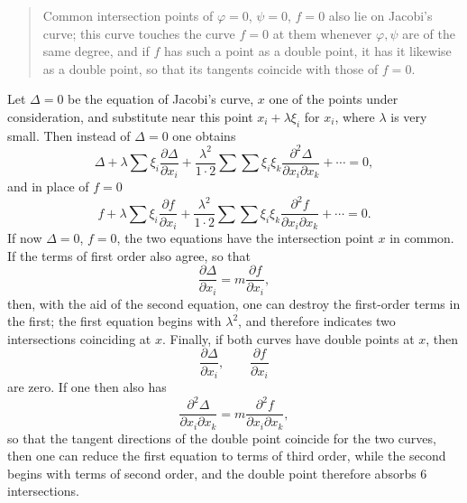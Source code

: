 \documentclass[10pt]{article}
\begin{document}
\begin{quote}
Common intersection points of \(\varphi=0\), \(\psi=0\), \(f=0\) also lie on Jacobi's curve; this curve touches the curve \(f=0\) at them whenever \(\varphi,\psi\) are of the same degree, and if \(f\) has such a point as a double point, it has it likewise as a double point, so that its tangents coincide with those of \(f=0\).
\end{quote}

Let \(\Delta=0\) be the equation of Jacobi's curve, \(x\) one of the points under consideration, and substitute near this point \(x_i+\lambda\xi_i\) for \(x_i\), where \(\lambda\) is very small. Then instead of \(\Delta=0\) one obtains
\[
\Delta+\lambda\sum \xi_i\frac{\partial\Delta}{\partial x_i}
+\frac{\lambda^2}{1\cdot2}\sum\sum \xi_i\xi_k
\frac{\partial^2\Delta}{\partial x_i\partial x_k}
+\cdots=0,
\]
and in place of \(f=0\)
\[
f+\lambda\sum \xi_i\frac{\partial f}{\partial x_i}
+\frac{\lambda^2}{1\cdot2}\sum\sum \xi_i\xi_k
\frac{\partial^2f}{\partial x_i\partial x_k}
+\cdots=0.
\]
If now \(\Delta=0\), \(f=0\), the two equations have the intersection point \(x\) in common. If the terms of first order also agree, so that
\[
\frac{\partial\Delta}{\partial x_i}
=m\frac{\partial f}{\partial x_i},
\]
then, with the aid of the second equation, one can destroy the first-order terms in the first; the first equation begins with \(\lambda^2\), and therefore indicates two intersections coinciding at \(x\). Finally, if both curves have double points at \(x\), then
\[
\frac{\partial\Delta}{\partial x_i},\qquad
\frac{\partial f}{\partial x_i}
\]
are zero. If one then also has
\[
\frac{\partial^2\Delta}{\partial x_i\partial x_k}
=m\frac{\partial^2f}{\partial x_i\partial x_k},
\]
so that the tangent directions of the double point coincide for the two curves, then one can reduce the first equation to terms of third order, while the second begins with terms of second order, and the double point therefore absorbs 6 intersections.
\end{document}
